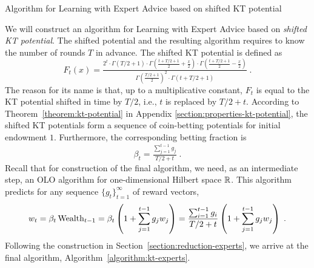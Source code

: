 \begin{algorithm}[t]
\begin{algorithmic}[1]
\caption{Algorithm for Learning with Expert Advice based on shifted KT potential
\label{algorithm:kt-experts}}
{
\ENDFOR
}
\end{algorithmic}
\end{algorithm}

We will construct an algorithm for Learning with Expert Advice based on
\emph{shifted KT potential}. The shifted potential and the resulting algorithm
requires to know the number of rounds $T$ in advance. The shifted KT
potential is defined as
\[
F_t(x) = \tfrac{2^t \cdot \Gamma\left(T/2 + 1 \right) \cdot \Gamma\left(\tfrac{t+T/2+1}{2} + \frac{x}{2} \right) \cdot \Gamma\left(\tfrac{t+T/2+1}{2} - \frac{x}{2} \right)}{\Gamma\left(\tfrac{T/2+1}{2} \right)^2 \cdot \Gamma \left(t+T/2+1\right)} \; .
\]
The reason for its name is that, up to a multiplicative constant, $F_t$ is equal
to the KT potential shifted in time by $T/2$, i.e., $t$ is replaced by $T/2+t$.
According to Theorem~\ref{theorem:kt-potential} in Appendix
\ref{section:properties-kt-potential}, the shifted KT potentials form
a sequence of coin-betting potentials for initial endowment $1$. Furthermore, the
corresponding betting fraction is
\[
\beta_t = \tfrac{\sum_{j=1}^{t-1} g_j}{T/2+t} \; .
\]
Recall that for construction of the final algorithm, we need, as an intermediate
step, an OLO algorithm for one-dimensional Hilbert space $\mathbb{R}$. This algorithm
predicts for any sequence $\{g_t\}_{t=1}^\infty$ of reward vectors,
\[
w_t
= \beta_t \operatorname{Wealth}_{t-1}
= \beta_t \left(1 + \sum_{j=1}^{t-1} g_j w_j \right)
= \frac{\sum_{i=1}^{t-1} g_i}{T/2+t} \left(1 + \sum_{j=1}^{t-1} g_j w_j \right) \; .
\]
Following the construction in Section~\ref{section:reduction-experts}, we arrive
at the final algorithm, Algorithm~\ref{algorithm:kt-experts}.


